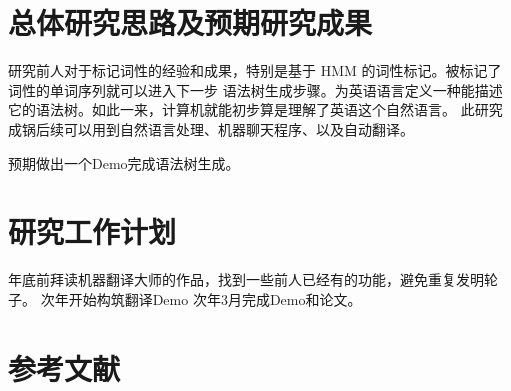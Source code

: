 \section{总体研究思路及预期研究成果}

研究前人对于标记词性的经验和成果，特别是基于 HMM 的词性标记。被标记了词性的单词序列就可以进入下一步
语法树生成步骤。为英语语言定义一种能描述它的语法树。如此一来，计算机就能初步算是理解了英语这个自然语言。
此研究成锅后续可以用到自然语言处理、机器聊天程序、以及自动翻译。

预期做出一个Demo完成语法树生成。

\section{研究工作计划}

年底前拜读机器翻译大师的作品，找到一些前人已经有的功能，避免重复发明轮子。
次年开始构筑翻译Demo
次年3月完成Demo和论文。


\section{参考文献}

\nocite{STATMT}


